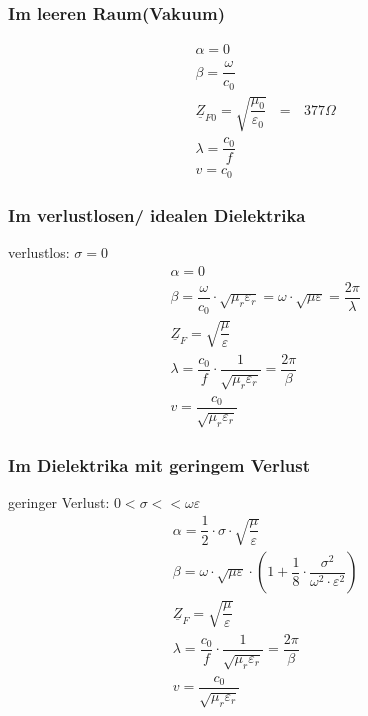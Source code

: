 \subsubsection{Im leeren Raum(Vakuum)}
\begin{align*}
     & \alpha = 0                                                                         \\
     & \beta = \dfrac{\omega}{c_0}                                                        \\
     & \boxed{\underline{Z}_{F0} = \sqrt{\dfrac{\mu_0}{\varepsilon_0}}\text{ }=\text{ }377\Omega} \\
     & \lambda = \dfrac{c_0}{f}                                                           \\
     & v = c_0
\end{align*}

\subsubsection{Im verlustlosen/ idealen Dielektrika}
verlustlos: $\sigma =0$
\begin{align*}
     & \alpha = 0                                                                                                       \\
     & \beta = \dfrac{\omega}{c_0}\cdot\sqrt{\mu_r\varepsilon_r}=\omega\cdot\sqrt{\mu\varepsilon}=\dfrac{2\pi}{\lambda} \\
     & \underline{Z}_F = \sqrt{\dfrac{\mu}{\varepsilon}}                                                                \\
     & \lambda = \dfrac{c_0}{f}\cdot\dfrac{1}{\sqrt{\mu_r\varepsilon_r}}=\dfrac{2\pi}{\beta}                            \\
     & v = \dfrac{c_0}{\sqrt{\mu_r\varepsilon_r}}
\end{align*}

\subsubsection{Im Dielektrika mit geringem Verlust}
geringer Verlust: $0 < \sigma <<\omega\varepsilon$
\begin{align*}
     & \alpha = \dfrac{1}{2}\cdot\sigma\cdot\sqrt{\dfrac{\mu}{\varepsilon}}                                                      \\
     & \beta = \omega\cdot\sqrt{\mu\varepsilon}\cdot\left(1+\dfrac{1}{8}\cdot\dfrac{\sigma^2}{\omega^2\cdot\varepsilon^2}\right) \\
     & \underline{Z}_F = \sqrt{\dfrac{\mu}{\varepsilon}}                                                                         \\
     & \lambda = \dfrac{c_0}{f}\cdot\dfrac{1}{\sqrt{\mu_r\varepsilon_r}}=\dfrac{2\pi}{\beta}                                     \\
     & v = \dfrac{c_0}{\sqrt{\mu_r\varepsilon_r}}
\end{align*}

